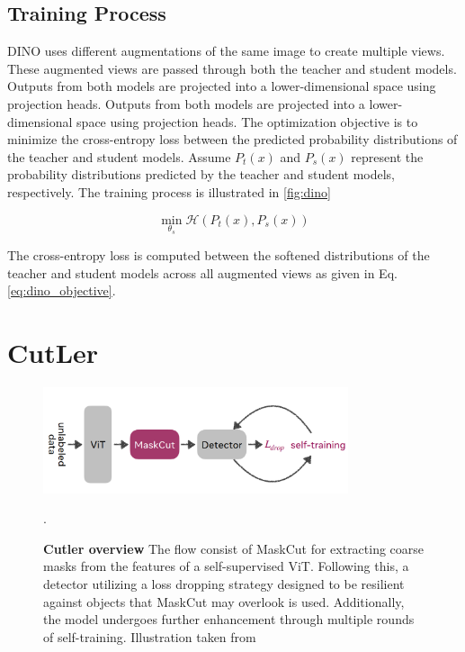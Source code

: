 {\subsection{Training Process}
DINO uses different augmentations of the same image to create multiple views. These augmented views are passed through both the teacher and student models. Outputs from both models are projected into a lower-dimensional space using projection heads. Outputs from both models are projected into a lower-dimensional space using projection heads. The optimization objective is to minimize the cross-entropy loss between the predicted probability distributions of the teacher and student models. Assume \(P_t(x)\) and \(P_s(x)\) represent the probability distributions predicted by the teacher and student models, respectively. The training process is illustrated in \ref{fig:dino}

\begin{equation}
	\label{eq:dino_objective}
	\min_{\theta_s} \mathcal{H}(P_t(x), P_s(x))
\end{equation}

The cross-entropy loss is computed between the softened distributions of the teacher and student models across all augmented views as given in Eq. \ref{eq:dino_objective}.

\section{CutLer}
\begin{figure}
	\centering
	\includegraphics[width=0.8\textwidth]{Images/main/cutler_flow.png}
	\caption[\textbf{Cutler overview}]{\textbf{Cutler overview} The flow consist of MaskCut for extracting coarse masks from the features of a self-supervised ViT. Following this, a detector utilizing a loss dropping strategy designed to be resilient against objects that MaskCut may overlook is used. Additionally, the model undergoes further enhancement through multiple rounds of self-training. Illustration taken from \cite{wang2023cut}}.
	\label{fig:cutler_flow}
\end{figure} 

}
